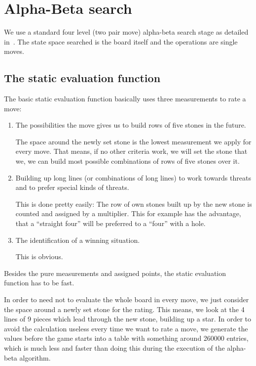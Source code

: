 \documentclass[10pt]{article}
\begin{document}
\section{Alpha-Beta search}

We use a standard four level (two pair move) alpha-beta search stage as
detailed in~\cite{Nilsson99}.  The state space searched is the board itself
and the operations are single moves.

\subsection{The static evaluation function}

The basic static evaluation function basically uses three measurements to rate a move:

\begin{enumerate}
\item The possibilities the move gives us to build rows of five stones in the future.

The space around the newly set stone is the lowest measurement we apply for
every move. That means, if no other criteria work, we will set the stone that
we, we can build most possible combinations of rows of five stones over it.

\item Building up long lines (or combinations of long lines) to work towards
threats and to prefer special kinds of threats.

This is done pretty easily: The row of own stones built up by the new stone is
counted and assigned by a multiplier. This for example has the advantage, that
a ``straight four'' will be preferred to a ``four'' with a hole.

\item The identification of a winning situation.

This is obvious.

\end{enumerate}

Besides the pure measurements and assigned points, the static evaluation
function has to be fast.

In order to need not to evaluate the whole board in every move, we just
consider the space around a newly set stone for the rating. This means, we look
at the 4 lines of 9 pieces which lead through the new stone, building up a
star. In order to avoid the calculation useless every time we want to rate a
move, we generate the values before the game starts into a table with something
around 260000 entries, which is much less and faster than doing this during the
execution of the alpha-beta algorithm.
\end{document}

